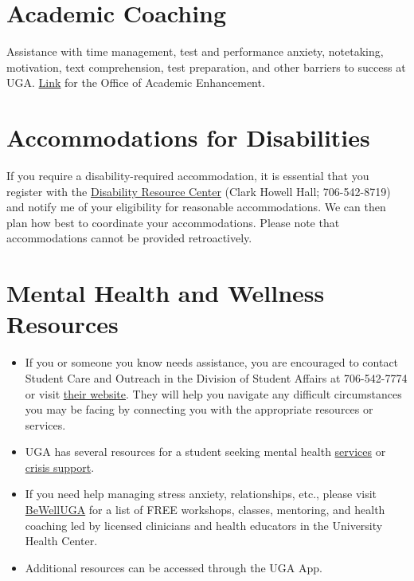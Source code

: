 \documentclass[12pt]{article}
\begin{document}
\vspace{-2mm}
\section*{\normalsize Academic Coaching}
\vspace{-4mm}

Assistance with time management, test and performance anxiety,
notetaking, motivation, text comprehension, test preparation, and
other barriers to success at
UGA. \href{https://dae.uga.edu/services/academic-coaching/}{\color{blue}
  Link} for the Office of Academic Enhancement. 

\vspace{-2mm}
\section*{\normalsize Accommodations for Disabilities}
\vspace{-4mm}

If you require a disability-required accommodation, it is essential
that you register with the \href{https://drc.uga.edu}{Disability Resource Center} (Clark Howell
Hall; 706-542-8719)
and notify me of your eligibility for reasonable accommodations. We
can then plan how best to coordinate your accommodations. Please note
that accommodations cannot be provided retroactively.



\vspace{-2mm}
\section*{\normalsize Mental Health and Wellness Resources}
\vspace{-4mm}

\begin{itemize}
  \setlength\itemsep{-6pt}
  \item If you or someone you know needs assistance, you are
    encouraged to contact Student Care and Outreach in the Division of
    Student Affairs at 706-542-7774 or visit
    \href{https://sco.uga.edu}{their website}. They
    will help you navigate any difficult circumstances you may be facing
    by connecting you with the appropriate resources or services.
  \item UGA has several resources for a student seeking mental health
    \href{https://www.uhs.uga.edu/bewelluga/bewelluga}{services} or
    \href{https://www.uhs.uga.edu/info/emergencies}{crisis support}.
  \item If you need help managing stress anxiety, relationships, etc.,
    please visit \href{https://www.uhs.uga.edu/bewelluga/bewelluga}{BeWellUGA}
    for a list of FREE workshops, classes, mentoring, and health
    coaching led by licensed clinicians and health educators in the
    University Health Center.
  \item Additional resources can be accessed through the UGA App.
\end{itemize}
\end{document}
